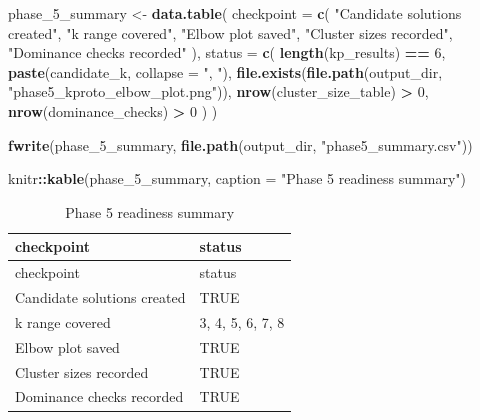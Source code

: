\documentclass[
]{article}
\newenvironment{Shaded}{\begin{snugshade}}{\end{snugshade}}
\newcommand{\AttributeTok}[1]{\textcolor[rgb]{0.13,0.29,0.53}{#1}}
\newcommand{\DecValTok}[1]{\textcolor[rgb]{0.00,0.00,0.81}{#1}}
\newcommand{\FunctionTok}[1]{\textcolor[rgb]{0.13,0.29,0.53}{\textbf{#1}}}
\newcommand{\NormalTok}[1]{#1}
\newcommand{\OtherTok}[1]{\textcolor[rgb]{0.56,0.35,0.01}{#1}}
\newcommand{\SpecialCharTok}[1]{\textcolor[rgb]{0.81,0.36,0.00}{\textbf{#1}}}
\newcommand{\StringTok}[1]{\textcolor[rgb]{0.31,0.60,0.02}{#1}}
\begin{document}
\begin{Shaded}
\begin{Highlighting}[]
\NormalTok{phase\_5\_summary }\OtherTok{\textless{}{-}} \FunctionTok{data.table}\NormalTok{(}
  \AttributeTok{checkpoint =} \FunctionTok{c}\NormalTok{(}
    \StringTok{"Candidate solutions created"}\NormalTok{,}
    \StringTok{"k range covered"}\NormalTok{,}
    \StringTok{"Elbow plot saved"}\NormalTok{,}
    \StringTok{"Cluster sizes recorded"}\NormalTok{,}
    \StringTok{"Dominance checks recorded"}
\NormalTok{  ),}
  \AttributeTok{status =} \FunctionTok{c}\NormalTok{(}
    \FunctionTok{length}\NormalTok{(kp\_results) }\SpecialCharTok{==} \DecValTok{6}\NormalTok{,}
    \FunctionTok{paste}\NormalTok{(candidate\_k, }\AttributeTok{collapse =} \StringTok{", "}\NormalTok{),}
    \FunctionTok{file.exists}\NormalTok{(}\FunctionTok{file.path}\NormalTok{(output\_dir, }\StringTok{"phase5\_kproto\_elbow\_plot.png"}\NormalTok{)),}
    \FunctionTok{nrow}\NormalTok{(cluster\_size\_table) }\SpecialCharTok{\textgreater{}} \DecValTok{0}\NormalTok{,}
    \FunctionTok{nrow}\NormalTok{(dominance\_checks) }\SpecialCharTok{\textgreater{}} \DecValTok{0}
\NormalTok{  )}
\NormalTok{)}

\FunctionTok{fwrite}\NormalTok{(phase\_5\_summary, }\FunctionTok{file.path}\NormalTok{(output\_dir, }\StringTok{"phase5\_summary.csv"}\NormalTok{))}

\NormalTok{knitr}\SpecialCharTok{::}\FunctionTok{kable}\NormalTok{(phase\_5\_summary, }\AttributeTok{caption =} \StringTok{"Phase 5 readiness summary"}\NormalTok{)}
\end{Highlighting}
\end{Shaded}

\begin{longtable}[]{@{}ll@{}}
\caption{Phase 5 readiness summary}\tabularnewline
\toprule\noalign{}
checkpoint & status \\
\midrule\noalign{}
\endfirsthead
\toprule\noalign{}
checkpoint & status \\
\midrule\noalign{}
\endhead
\bottomrule\noalign{}
\endlastfoot
Candidate solutions created & TRUE \\
k range covered & 3, 4, 5, 6, 7, 8 \\
Elbow plot saved & TRUE \\
Cluster sizes recorded & TRUE \\
Dominance checks recorded & TRUE \\
\end{longtable}
\end{document}
